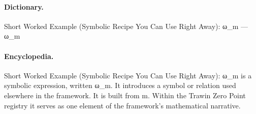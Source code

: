 \paragraph{Dictionary.}
Short Worked Example (Symbolic Recipe You Can Use Right Away): ω\_m — ω\_m

\paragraph{Encyclopedia.}
Short Worked Example (Symbolic Recipe You Can Use Right Away): ω\_m is a symbolic expression, written ω\_m. It introduces a symbol or relation used elsewhere in the framework. It is built from m. Within the Trawin Zero Point registry it serves as one element of the framework's mathematical narrative.
